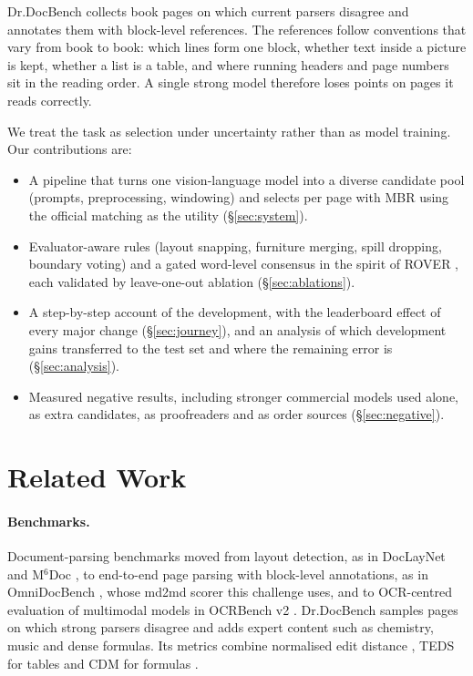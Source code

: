\documentclass[11pt]{article}
\begin{document}
Dr.DocBench \citep{drdocbench} collects book pages on which current parsers disagree and annotates them with block-level references. The references follow conventions that vary from book to book: which lines form one block, whether text inside a picture is kept, whether a list is a table, and where running headers and page numbers sit in the reading order. A single strong model therefore loses points on pages it reads correctly.

We treat the task as selection under uncertainty rather than as model training. Our contributions are:
\begin{itemize}
  \setlength\itemsep{0pt}
  \item A pipeline that turns one vision-language model into a diverse candidate pool (prompts, preprocessing, windowing) and selects per page with MBR \citep{kumar-byrne-2004-minimum} using the official matching as the utility (\S\ref{sec:system}).
  \item Evaluator-aware rules (layout snapping, furniture merging, spill dropping, boundary voting) and a gated word-level consensus in the spirit of ROVER \citep{fiscus1997rover}, each validated by leave-one-out ablation (\S\ref{sec:ablations}).
  \item A step-by-step account of the development, with the leaderboard effect of every major change (\S\ref{sec:journey}), and an analysis of which development gains transferred to the test set and where the remaining error is (\S\ref{sec:analysis}).
  \item Measured negative results, including stronger commercial models used alone, as extra candidates, as proofreaders and as order sources (\S\ref{sec:negative}).
\end{itemize}

\section{Related Work}
\paragraph{Benchmarks.} Document-parsing benchmarks moved from layout detection, as in DocLayNet \citep{doclaynet} and M$^6$Doc \citep{m6doc}, to end-to-end page parsing with block-level annotations, as in OmniDocBench \citep{omnidocbench}, whose md2md scorer this challenge uses, and to OCR-centred evaluation of multimodal models in OCRBench v2 \citep{ocrbenchv2}. Dr.DocBench \citep{drdocbench} samples pages on which strong parsers disagree and adds expert content such as chemistry, music and dense formulas. Its metrics combine normalised edit distance \citep{levenshtein1966}, TEDS for tables \citep{teds} and CDM for formulas \citep{cdm}.
\end{document}
